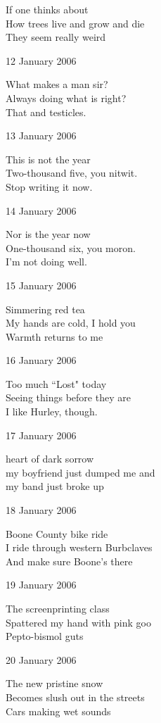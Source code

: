 \documentclass[12pt]{article}
\begin{document}
If one thinks about \\
How trees live and grow and die \\
They seem really weird

12 January 2006

What makes a man sir? \\
Always doing what is right? \\
That and testicles.

13 January 2006

This is not the year \\
Two-thousand five, you nitwit. \\
Stop writing it now.



\newpage

14 January 2006

Nor is the year now \\
One-thousand six, you moron. \\
I'm not doing well.

15 January 2006

Simmering red tea \\
My hands are cold, I hold you \\
Warmth returns to me

16 January 2006

Too much ``Lost" today \\
Seeing things before they are \\
I like Hurley, though.

17 January 2006

heart of dark sorrow \\
my boyfriend just dumped me and \\
my band just broke up

18 January 2006

Boone County bike ride \\
I ride through western Burbclaves \\
And make sure Boone's there

19 January 2006

The screenprinting class \\
Spattered my hand with pink goo \\
Pepto-bismol guts


\newpage

20 January 2006

The new pristine snow \\
Becomes slush out in the streets \\
Cars making wet sounds
\end{document}
